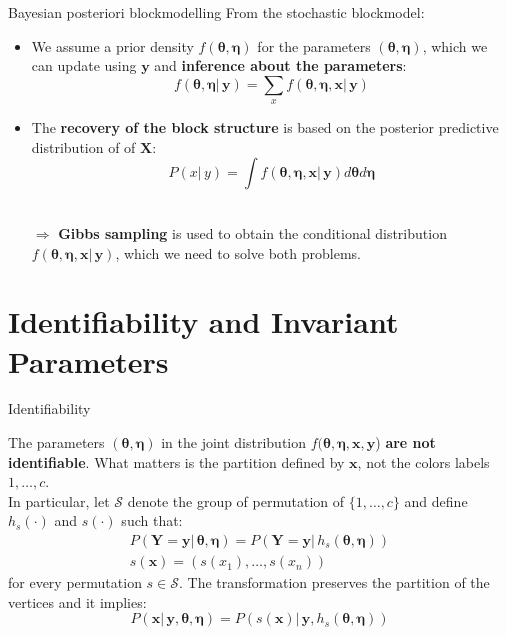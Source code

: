 \documentclass[aspectratio=169,xcolor=dvipsnames]{beamer}
\newcommand{\vecx}{\textbf{x}}
\newcommand{\vecy}{\textbf{y}}
\newcommand{\matx}{\textbf{X}}
\newcommand{\maty}{\textbf{Y}}
\newcommand{\veceta}{\boldsymbol{\eta}}
\newcommand{\vectheta}{\boldsymbol{\theta}}
\begin{document}
\begin{frame}{Bayesian posteriori blockmodelling}
From the stochastic blockmodel:
\pause
\begin{itemize}[<+->]
    \item We assume a prior density $f(\vectheta,\veceta)$ for the parameters $(\vectheta,\veceta)$, which we can update using $\vecy$ and \textbf{inference about the parameters}:
    $$
    f(\vectheta,\veceta| \, \vecy) = \sum_{x} f(\vectheta,\veceta, \vecx| \, \vecy)
    $$
    \item The \textbf{recovery of the block structure} is based on the posterior predictive distribution of of $\matx$:
    $$
    P(x| \, y) = \int  f(\vectheta,\veceta, \vecx| \, \vecy) d\vectheta d\veceta
    $$\\
    
    \item[$\Longrightarrow$] \textbf{Gibbs sampling} is used to obtain the conditional distribution $f(\vectheta,\veceta, \vecx| \, \vecy)$, which we need to solve both problems.
 \end{itemize}

\end{frame}
\section{Identifiability and Invariant Parameters}
\begin{frame}{Identifiability}

The parameters $(\vectheta, \veceta)$ in the joint distribution $f(\vectheta, \veceta, \vecx, \vecy$) \textbf{are not identifiable}. What matters is the partition defined by $\vecx$, not the colors labels $1, \dots, c$. \\
\pause
\vspace{10pt}
In particular, let $\mathcal{S}$ denote the group of permutation of $\{1, \dots ,c\}$ and define $h_s(\cdot)$ and $s(\cdot)$ such that:
    \begin{gather*}
       P(\maty =\vecy | \, \vectheta, \veceta ) = P(\maty =\vecy | \, h_s(\vectheta, \veceta) )\\
       s(\vecx) = ( s(x_1), \dots, s(x_n))
    \end{gather*}
    for every permutation $s \in \mathcal{S}$. \pause The transformation preserves the partition of the vertices and it implies:
    $$
    P(\vecx | \, \vecy, \vectheta, \veceta) = P(s(\vecx) | \, \vecy, h_s(\vectheta, \veceta))
    $$

\end{frame}
\end{document}
